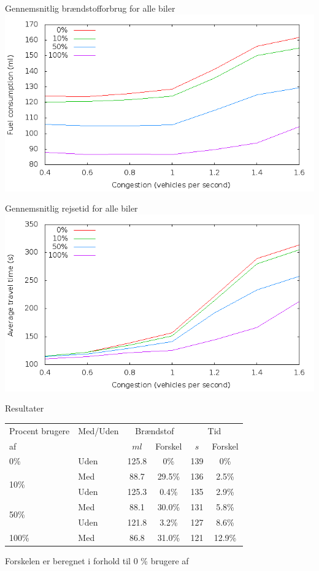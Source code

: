 \begin{frame}{Gennemsnitlig brændstofforbrug for alle biler}
\includegraphics[width=1\textwidth]{../images/fuelCongestion.png}
\end{frame}

\begin{frame}{Gennemsnitlig rejsetid for alle biler}
\includegraphics[width=1\textwidth]{../images/timeCongestion.png}
\end{frame}


\begin{frame}{Resultater}

\centering
\begin{tabular}{|l|l|cc|cc|}\hline
Procent brugere			& Med/Uden & \multicolumn{2}{c|}{Brændstof} 	& \multicolumn{2}{c|}{Tid}\\
af \tech				&\tech		& $ml$		& Forskel			&	$s$	& Forskel\\\hline
\multirow{1}{*}{0\%}	& Uden	&	125.8	&	0\%			&	139 & 0\%		\\\hline
\multirow{2}{*}{10\%}	& Med 		&	88.7	&	29.5\%		&	136 & 2.5\%		\\
						& Uden 	&	125.3	&	0.4\%		&	135 & 2.9\%		\\\hline
\multirow{2}{*}{50\%}	& Med		&	88.1	&	30.0\%		&	131 & 5.8\%		\\
						& Uden	&	121.8	&	3.2\%		&	127 & 8.6\%		\\\hline
\multirow{1}{*}{100\%}	& Med		&	86.8	&	31.0\%		&	121 & 12.9\%	\\\hline
\end{tabular}

\vspace{2mm}
Forskelen er beregnet i forhold til 0 \% brugere af \tech
\label{tb:TestResults:total}
\end{frame}
